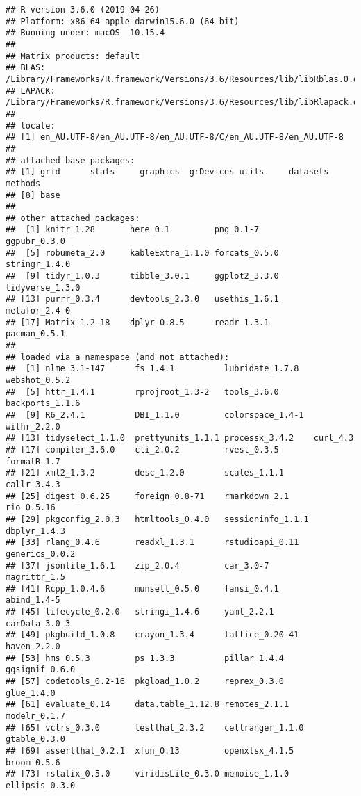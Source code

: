 \documentclass[]{article}
\begin{document}
\begin{verbatim}
## R version 3.6.0 (2019-04-26)
## Platform: x86_64-apple-darwin15.6.0 (64-bit)
## Running under: macOS  10.15.4
## 
## Matrix products: default
## BLAS:   /Library/Frameworks/R.framework/Versions/3.6/Resources/lib/libRblas.0.dylib
## LAPACK: /Library/Frameworks/R.framework/Versions/3.6/Resources/lib/libRlapack.dylib
## 
## locale:
## [1] en_AU.UTF-8/en_AU.UTF-8/en_AU.UTF-8/C/en_AU.UTF-8/en_AU.UTF-8
## 
## attached base packages:
## [1] grid      stats     graphics  grDevices utils     datasets  methods  
## [8] base     
## 
## other attached packages:
##  [1] knitr_1.28       here_0.1         png_0.1-7        ggpubr_0.3.0    
##  [5] robumeta_2.0     kableExtra_1.1.0 forcats_0.5.0    stringr_1.4.0   
##  [9] tidyr_1.0.3      tibble_3.0.1     ggplot2_3.3.0    tidyverse_1.3.0 
## [13] purrr_0.3.4      devtools_2.3.0   usethis_1.6.1    metafor_2.4-0   
## [17] Matrix_1.2-18    dplyr_0.8.5      readr_1.3.1      pacman_0.5.1    
## 
## loaded via a namespace (and not attached):
##  [1] nlme_3.1-147      fs_1.4.1          lubridate_1.7.8   webshot_0.5.2    
##  [5] httr_1.4.1        rprojroot_1.3-2   tools_3.6.0       backports_1.1.6  
##  [9] R6_2.4.1          DBI_1.1.0         colorspace_1.4-1  withr_2.2.0      
## [13] tidyselect_1.1.0  prettyunits_1.1.1 processx_3.4.2    curl_4.3         
## [17] compiler_3.6.0    cli_2.0.2         rvest_0.3.5       formatR_1.7      
## [21] xml2_1.3.2        desc_1.2.0        scales_1.1.1      callr_3.4.3      
## [25] digest_0.6.25     foreign_0.8-71    rmarkdown_2.1     rio_0.5.16       
## [29] pkgconfig_2.0.3   htmltools_0.4.0   sessioninfo_1.1.1 dbplyr_1.4.3     
## [33] rlang_0.4.6       readxl_1.3.1      rstudioapi_0.11   generics_0.0.2   
## [37] jsonlite_1.6.1    zip_2.0.4         car_3.0-7         magrittr_1.5     
## [41] Rcpp_1.0.4.6      munsell_0.5.0     fansi_0.4.1       abind_1.4-5      
## [45] lifecycle_0.2.0   stringi_1.4.6     yaml_2.2.1        carData_3.0-3    
## [49] pkgbuild_1.0.8    crayon_1.3.4      lattice_0.20-41   haven_2.2.0      
## [53] hms_0.5.3         ps_1.3.3          pillar_1.4.4      ggsignif_0.6.0   
## [57] codetools_0.2-16  pkgload_1.0.2     reprex_0.3.0      glue_1.4.0       
## [61] evaluate_0.14     data.table_1.12.8 remotes_2.1.1     modelr_0.1.7     
## [65] vctrs_0.3.0       testthat_2.3.2    cellranger_1.1.0  gtable_0.3.0     
## [69] assertthat_0.2.1  xfun_0.13         openxlsx_4.1.5    broom_0.5.6      
## [73] rstatix_0.5.0     viridisLite_0.3.0 memoise_1.1.0     ellipsis_0.3.0
\end{verbatim}
\end{document}

